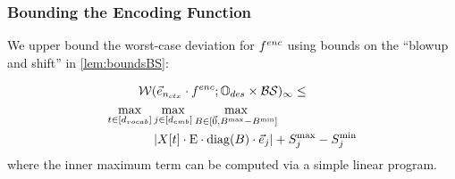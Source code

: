 \newcommand{\ModelFinalC}{{\ModelFinal}'}
\newcommand{\eqclassAlgWD}{\texttt{BoundSoftmax}\WD}
\newcommand{\findAlpha}{\texttt{Find}\_\beta}
\newcommand{\findAlphaMin}{\text{Algorithm to find }\ssMinFA}
\newcommand{\findAlphaMax}{\text{Algorithm to find }\ssMaxFA}
\newcommand{\findAlphaMinR}{\text{Algorithm to find }\ssMinRA}
\newcommand{\findAlphaMaxR}{\text{Algorithm to find }\ssMaxRA}
\newcommand{\obj}{\text{objective}}
\newcommand{\freeToks}{\texttt{FreeToks}}

\newcommand{\minBilin}{\texttt{MinBilinear}}
\newcommand{\maxBilin}{\texttt{MaxBilinear}}
\newcommand{\lowerBounds}{\vec{r}^{\min}}
\newcommand{\upperBounds}{\vec{r}^{\max}}

\subsubsection{Bounding the Encoding Function}
\label{sec:concrcase}
We upper bound the worst-case deviation for $f^{enc}$ using
bounds on the ``blowup and shift'' in \cref{lem:boundsBS}:
\begin{lemma}
	\label{lem:WD_fenc}
	\begin{align*}
		\mathcal{W}&(\vec{e}_{n_{ctx}} \cdot f^{enc}; \mathbb{O}_{des} \times \mathcal{B} \mathcal{S})_\infty \leq 
		\\ \max_{t \in [{d_{vocab}}]} &
		\max_{j \in [{d_{emb}}]}
		\max_{B \in [\vec{0}, B^{\max} - B^{\min}]} \\
		&\left|X[t] \cdot \text{E} \cdot \mathrm{diag}(B) \cdot \vec{e}_j\right| + S_j^{\max} - S_j^{\min}
	\end{align*}
	where the inner maximum term can be computed via a simple linear program.
\end{lemma}




